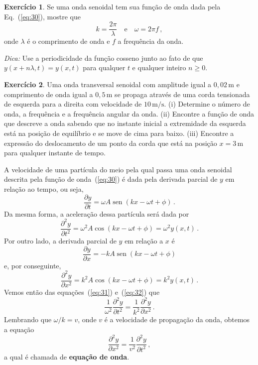\documentclass[twocolumn=on,fontsize=12pt,DIV=calc]{scrartcl}
\theoremstyle{definition}
\newtheorem{ex}{Exercício}[section]
\DeclareMathOperator{\sen}{sen}
\begin{document}
\begin{ex}
  Se uma onda senoidal tem sua função de onda dada pela
  Eq.~(\ref{eq:30}), mostre que
  $$k=\frac{2\pi}{\lambda}\quad\text{e}\quad \omega=2\pi f\,,$$
  onde $\lambda$ é o comprimento de onda e $f$ a frequência da onda.

  \noindent\textit{Dica:} Use a periodicidade da função cosseno junto
  ao fato de que $y(x+n\lambda,t)=y(x,t)$ para qualquer $t$ e qualquer
  inteiro $n\ge 0$.
\end{ex}

\begin{ex}
  Uma onda transversal senoidal com amplitude igual a
  $0{,}02\,\mathrm{m}$ e comprimento de onda igual a
  $0{,}5\,\mathrm{m}$ se propaga através de uma corda tensionada de
  esquerda para a direita com velocidade de $10\,\mathrm{m/s}$. (i)
  Determine o número de onda, a frequência e a frequência angular da
  onda. (ii) Encontre a função de onda que descreve a onda sabendo que
  no instante inicial a extremidade da esquerda está na posição de
  equilíbrio e se move de cima para baixo. (iii) Encontre a expressão
  do deslocamento de um ponto da corda que está na posição
  $x=3\,\mathrm{m}$ para qualquer instante de tempo.
\end{ex}

A velocidade de uma partícula do meio pela qual passa uma onda
senoidal descrita pela função de onda~(\ref{eq:30}) é dada pela
derivada parcial de $y$ em relação ao tempo, ou seja,
$$\frac{\partial y}{\partial t}=\omega A\sen(kx-\omega t+\phi)\,.$$
Da mesma forma, a aceleração dessa partícula será dada por
\begin{equation}
  \label{eq:31}
  \frac{\partial^2 y}{\partial t^2}=\omega^2A\cos(kx-\omega t+\phi)=\omega^2y(x,t)\,.
\end{equation}
Por outro lado, a derivada parcial de $y$ em relação a $x$ é
$$\frac{\partial y}{\partial x}=-kA\sen(kx-\omega t+\phi)$$
e, por conseguinte,
\begin{equation}
  \label{eq:32}
  \frac{\partial^2 y}{\partial x^2}=k^2A\cos(kx-\omega t+\phi)=k^2y(x,t)\,.
\end{equation}
Vemos então das equações~(\ref{eq:31}) e~(\ref{eq:32}) que
$$\frac{1}{\omega^2}\frac{\partial^2 y}{\partial t^2}=\frac{1}{k^2}\frac{\partial^2 y}{\partial x^2}\,.$$
Lembrando que $\omega/k=v$, onde $v$ é a velocidade de propagação da
onda, obtemos a equação
\begin{equation}
  \label{eq:33}
  \frac{\partial^2 y}{\partial x^2}=\frac{1}{v^2}\frac{\partial^2 y}{\partial t^2}\,,
\end{equation}
a qual é chamada de \textbf{equação de onda}.
\end{document}
